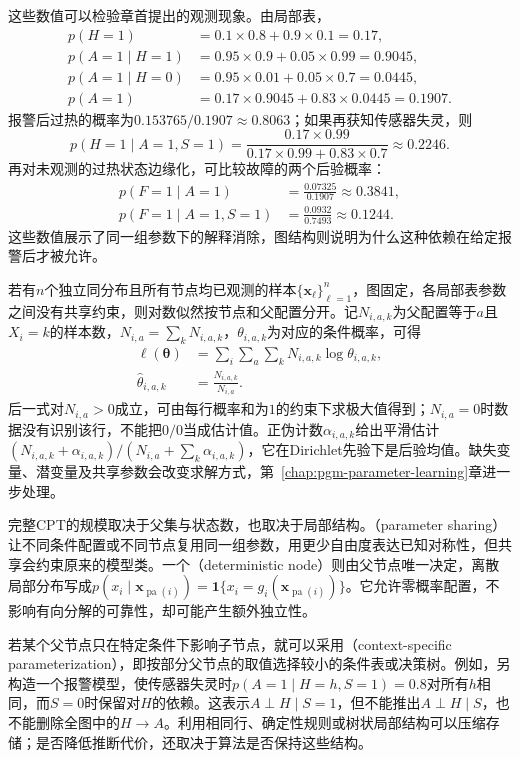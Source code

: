 这些数值可以检验章首提出的观测现象。由局部表，
\[
  \begin{aligned}
    p(H=1)&=0.1\times0.8+0.9\times0.1=0.17,\\
    p(A=1\mid H=1)&=0.95\times0.9+0.05\times0.99=0.9045,\\
    p(A=1\mid H=0)&=0.95\times0.01+0.05\times0.7=0.0445,\\
    p(A=1)&=0.17\times0.9045+0.83\times0.0445=0.1907.
  \end{aligned}
\]
报警后过热的概率为$0.153765/0.1907\approx0.8063$；如果再获知传感器失灵，则
\[
  p(H=1\mid A=1,S=1)
    =\frac{0.17\times0.99}
      {0.17\times0.99+0.83\times0.7}
    \approx0.2246.
\]
再对未观测的过热状态边缘化，可比较故障的两个后验概率：
\[
  \begin{aligned}
    p(F=1\mid A=1)&=\frac{0.07325}{0.1907}\approx0.3841,\\
    p(F=1\mid A=1,S=1)&=\frac{0.0932}{0.7493}\approx0.1244.
  \end{aligned}
\]
这些数值展示了同一组参数下的解释消除，图结构则说明为什么这种依赖在给定报警后才被允许。

若有$n$个独立同分布且所有节点均已观测的样本$\{\bm{x}_{\ell}\}_{\ell=1}^{n}$，图固定，各局部表参数之间没有共享约束，则对数似然按节点和父配置分开。记$N_{i,a,k}$为父配置等于$a$且$X_i=k$的样本数，$N_{i,a}=\sum_kN_{i,a,k}$，$\theta_{i,a,k}$为对应的条件概率，可得
\[
  \begin{aligned}
    \ell(\bm{\theta})
       &=\sum_i\sum_a\sum_kN_{i,a,k}\log\theta_{i,a,k},\\
    \widehat{\theta}_{i,a,k}&=\frac{N_{i,a,k}}{N_{i,a}}.
  \end{aligned}
\]
后一式对$N_{i,a}>0$成立，可由每行概率和为$1$的约束下求极大值得到；$N_{i,a}=0$时数据没有识别该行，不能把$0/0$当成估计值。正伪计数$\alpha_{i,a,k}$给出平滑估计$(N_{i,a,k}+\alpha_{i,a,k})/(N_{i,a}+\sum_k\alpha_{i,a,k})$，它在Dirichlet先验下是后验均值。缺失变量、潜变量及共享参数会改变求解方式，第~\ref{chap:pgm-parameter-learning}章进一步处理。

完整CPT的规模取决于父集与状态数，也取决于局部结构。（parameter sharing）让不同条件配置或不同节点复用同一组参数，用更少自由度表达已知对称性，但共享会约束原来的模型类。一个（deterministic node）则由父节点唯一决定，离散局部分布写成$p(x_i\mid\bm{x}_{\operatorname{pa}(i)})=\mathbf{1}\{x_i=g_i(\bm{x}_{\operatorname{pa}(i)})\}$。它允许零概率配置，不影响有向分解的可靠性，却可能产生额外独立性。

若某个父节点只在特定条件下影响子节点，就可以采用（context-specific parameterization），即按部分父节点的取值选择较小的条件表或决策树。例如，另构造一个报警模型，使传感器失灵时$p(A=1\mid H=h,S=1)=0.8$对所有$h$相同，而$S=0$时保留对$H$的依赖。这表示$A\perp H\mid S=1$，但不能推出$A\perp H\mid S$，也不能删除全图中的$H\to A$。利用相同行、确定性规则或树状局部结构可以压缩存储；是否降低推断代价，还取决于算法是否保持这些结构。

